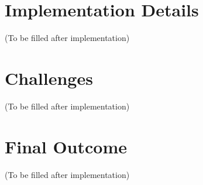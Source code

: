 \documentclass[a4paper,12pt]{report}
\begin{document}
\section{Implementation Details}
(To be filled after implementation)

\section{Challenges}
(To be filled after implementation)

\section{Final Outcome}
(To be filled after implementation)
\end{document}
